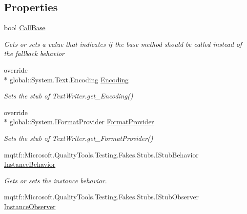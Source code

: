 \subsection*{Properties}
\begin{DoxyCompactItemize}
\item 
bool \hyperlink{class_system_1_1_i_o_1_1_fakes_1_1_stub_text_writer_abfe2ad4b7fcfacf7471d3cb61f4853c5}{Call\-Base}
\begin{DoxyCompactList}\small\item\em Gets or sets a value that indicates if the base method should be called instead of the fallback behavior\end{DoxyCompactList}\item 
override \\*
global\-::\-System.\-Text.\-Encoding \hyperlink{class_system_1_1_i_o_1_1_fakes_1_1_stub_text_writer_a09bfb20c1c0244ed2e7c8ffbf3b06ab1}{Encoding}
\begin{DoxyCompactList}\small\item\em Sets the stub of Text\-Writer.\-get\-\_\-\-Encoding()\end{DoxyCompactList}\item 
override \\*
global\-::\-System.\-I\-Format\-Provider \hyperlink{class_system_1_1_i_o_1_1_fakes_1_1_stub_text_writer_ac3b061327b2956dacbd966f243a64f14}{Format\-Provider}
\begin{DoxyCompactList}\small\item\em Sets the stub of Text\-Writer.\-get\-\_\-\-Format\-Provider()\end{DoxyCompactList}\item 
mqttf\-::\-Microsoft.\-Quality\-Tools.\-Testing.\-Fakes.\-Stubs.\-I\-Stub\-Behavior \hyperlink{class_system_1_1_i_o_1_1_fakes_1_1_stub_text_writer_a6fc84b2e4c6a90bb095539c03c77ffc1}{Instance\-Behavior}
\begin{DoxyCompactList}\small\item\em Gets or sets the instance behavior.\end{DoxyCompactList}\item 
mqttf\-::\-Microsoft.\-Quality\-Tools.\-Testing.\-Fakes.\-Stubs.\-I\-Stub\-Observer \hyperlink{class_system_1_1_i_o_1_1_fakes_1_1_stub_text_writer_ae3d154a11af3ea7248cf70b9f5f8e699}{Instance\-Observer}

\end{DoxyCompactItemize}
